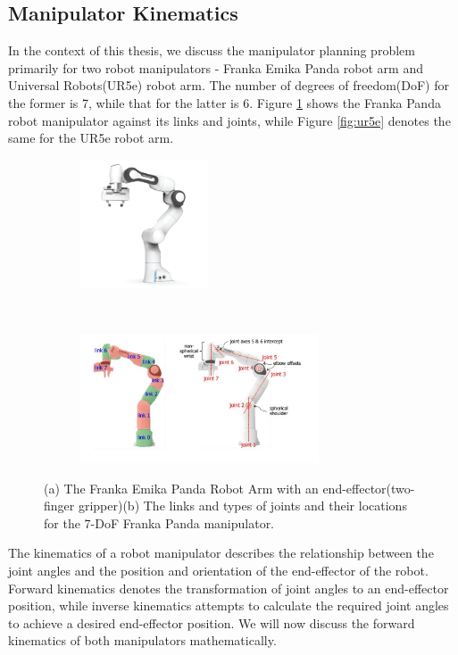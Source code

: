 \subsection{Manipulator Kinematics}\label{sec:bg-manipulator-kinematics}

In the context of this thesis, we discuss the manipulator planning problem primarily for two robot manipulators - Franka Emika Panda robot arm and Universal Robots(UR5e) robot arm. The number of degrees of freedom(DoF) for the former is 7, while that for the latter is 6. Figure \ref{fig:Franka-Panda} shows the Franka Panda robot manipulator against its links and joints, while Figure \ref{fig:ur5e} denotes the same for the UR5e robot arm. 

\begin{figure}[t!]
    \centering
    \begin{subfigure}[t]{0.4\textwidth}
        \centering
        \includegraphics[height=1.5in]{figures/background/franka_overview.png}
    \end{subfigure}%
    ~ 
    \begin{subfigure}[t]{0.5\textwidth}
        \centering
        \includegraphics[height=1.5in]{figures/background/franka_links.png}
    \end{subfigure}
    \caption[Franka Emika Panda Robot Arm]{(a) The Franka Emika Panda Robot Arm with an end-effector(two-finger gripper)(b) The links and types of joints and their locations for the 7-DoF Franka Panda manipulator.}
    \label{fig:Franka-Panda}
\end{figure}

The kinematics of a robot manipulator describes the relationship between the joint angles and the position and orientation of the end-effector of the robot. Forward kinematics denotes the transformation of joint angles to an end-effector position, while inverse kinematics attempts to calculate the required joint angles to achieve a desired end-effector position. We will now discuss the forward kinematics of both manipulators mathematically.


